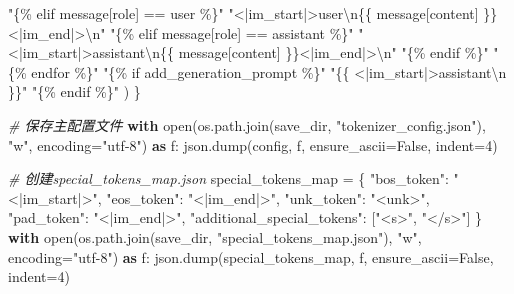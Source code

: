\documentclass[
]{article}
\newenvironment{Shaded}{}{}
\newcommand{\BuiltInTok}[1]{\textcolor[rgb]{0.00,0.50,0.00}{#1}}
\newcommand{\CharTok}[1]{\textcolor[rgb]{0.25,0.44,0.63}{#1}}
\newcommand{\CommentTok}[1]{\textcolor[rgb]{0.38,0.63,0.69}{\textit{#1}}}
\newcommand{\ControlFlowTok}[1]{\textcolor[rgb]{0.00,0.44,0.13}{\textbf{#1}}}
\newcommand{\DecValTok}[1]{\textcolor[rgb]{0.25,0.63,0.44}{#1}}
\newcommand{\ImportTok}[1]{\textcolor[rgb]{0.00,0.50,0.00}{\textbf{#1}}}
\newcommand{\NormalTok}[1]{#1}
\newcommand{\OperatorTok}[1]{\textcolor[rgb]{0.40,0.40,0.40}{#1}}
\newcommand{\SpecialCharTok}[1]{\textcolor[rgb]{0.25,0.44,0.63}{#1}}
\newcommand{\StringTok}[1]{\textcolor[rgb]{0.25,0.44,0.63}{#1}}
\newcommand{\VariableTok}[1]{\textcolor[rgb]{0.10,0.09,0.49}{#1}}
\begin{document}
\begin{Shaded}
\begin{Highlighting}[]
            \StringTok{"\{}\SpecialCharTok{\% e}\StringTok{lif message[\textquotesingle{}role\textquotesingle{}] == \textquotesingle{}user\textquotesingle{} \%\}"}
            \StringTok{"\textless{}|im\_start|\textgreater{}user}\CharTok{\textbackslash{}n}\SpecialCharTok{\{\{}\StringTok{ message[\textquotesingle{}content\textquotesingle{}] }\SpecialCharTok{\}\}}\StringTok{\textless{}|im\_end|\textgreater{}}\CharTok{\textbackslash{}n}\StringTok{"}
            \StringTok{"\{}\SpecialCharTok{\% e}\StringTok{lif message[\textquotesingle{}role\textquotesingle{}] == \textquotesingle{}assistant\textquotesingle{} \%\}"}
            \StringTok{"\textless{}|im\_start|\textgreater{}assistant}\CharTok{\textbackslash{}n}\SpecialCharTok{\{\{}\StringTok{ message[\textquotesingle{}content\textquotesingle{}] }\SpecialCharTok{\}\}}\StringTok{\textless{}|im\_end|\textgreater{}}\CharTok{\textbackslash{}n}\StringTok{"}
            \StringTok{"\{}\SpecialCharTok{\% e}\StringTok{ndif \%\}"}
            \StringTok{"\{}\SpecialCharTok{\% e}\StringTok{ndfor \%\}"}
            \StringTok{"\{}\SpecialCharTok{\% i}\StringTok{f add\_generation\_prompt \%\}"}
            \StringTok{"}\SpecialCharTok{\{\{}\StringTok{ \textquotesingle{}\textless{}|im\_start|\textgreater{}assistant}\CharTok{\textbackslash{}n}\StringTok{\textquotesingle{} }\SpecialCharTok{\}\}}\StringTok{"}
            \StringTok{"\{}\SpecialCharTok{\% e}\StringTok{ndif \%\}"}
\NormalTok{        )}
\NormalTok{    \}}

    \CommentTok{\# 保存主配置文件}
    \ControlFlowTok{with} \BuiltInTok{open}\NormalTok{(os.path.join(save\_dir, }\StringTok{"tokenizer\_config.json"}\NormalTok{), }\StringTok{"w"}\NormalTok{, encoding}\OperatorTok{=}\StringTok{"utf{-}8"}\NormalTok{) }\ImportTok{as}\NormalTok{ f:}
\NormalTok{        json.dump(config, f, ensure\_ascii}\OperatorTok{=}\VariableTok{False}\NormalTok{, indent}\OperatorTok{=}\DecValTok{4}\NormalTok{)}

    \CommentTok{\# 创建special\_tokens\_map.json}
\NormalTok{    special\_tokens\_map }\OperatorTok{=}\NormalTok{ \{}
        \StringTok{"bos\_token"}\NormalTok{: }\StringTok{"\textless{}|im\_start|\textgreater{}"}\NormalTok{,}
        \StringTok{"eos\_token"}\NormalTok{: }\StringTok{"\textless{}|im\_end|\textgreater{}"}\NormalTok{,}
        \StringTok{"unk\_token"}\NormalTok{: }\StringTok{"\textless{}unk\textgreater{}"}\NormalTok{,}
        \StringTok{"pad\_token"}\NormalTok{: }\StringTok{"\textless{}|im\_end|\textgreater{}"}\NormalTok{,}
        \StringTok{"additional\_special\_tokens"}\NormalTok{: [}\StringTok{"\textless{}s\textgreater{}"}\NormalTok{, }\StringTok{"\textless{}/s\textgreater{}"}\NormalTok{]}
\NormalTok{    \}}
    \ControlFlowTok{with} \BuiltInTok{open}\NormalTok{(os.path.join(save\_dir, }\StringTok{"special\_tokens\_map.json"}\NormalTok{), }\StringTok{"w"}\NormalTok{, encoding}\OperatorTok{=}\StringTok{"utf{-}8"}\NormalTok{) }\ImportTok{as}\NormalTok{ f:}
\NormalTok{        json.dump(special\_tokens\_map, f, ensure\_ascii}\OperatorTok{=}\VariableTok{False}\NormalTok{, indent}\OperatorTok{=}\DecValTok{4}\NormalTok{)}
\end{Highlighting}
\end{Shaded}
\end{document}
